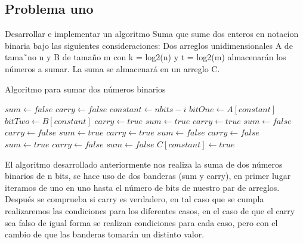 \documentclass[12pt,twoside]{article}
\begin{document}
\subsection*{Problema uno}
Desarrollar e implementar un algoritmo Suma que sume dos enteros en notacion
binaria bajo las siguientes consideraciones: Dos arreglos unidimensionales A de tama˜no n y
B de tamaño m con k = log2(n) y t = log2(m) almacenarán los números a sumar. La suma
se almacenará en un arreglo C.
\\
\begin{algorithm}[H]
    \caption{Algoritmo para sumar dos números binarios}
      \label{euclides}
      \begin{algorithmic}[1]
              \State $sum\gets false$
              \State $carry\gets false$
                      \State $constant\gets nbits-i$
                      \State $bitOne\gets A [constant]$
                      \State $bitTwo\gets B [constant]$
                      \State $carry\gets true$
                      \State $sum\gets true$
                      \State $carry\gets true$
                      \State $sum\gets false$
                      \Else
                      \State $carry\gets false$
                      \State $sum\gets true$
                      \EndIf
                      \Else
                      \State $carry\gets true$
                      \State $sum\gets false$
                      \State $carry\gets false$
                      \State $sum\gets true$
                      \Else
                      \State $carry\gets false$
                      \State $sum\gets false$
                      \EndIf
                      \EndIf
                      \State $C[constant]\gets true$
                      \EndIf
          \EndFor    
          \EndProcedure
      \end{algorithmic}
  \end{algorithm}
\vspace{10 mm}
El algoritmo desarrollado anteriormente nos realiza la suma de dos números binarios de n bits, se hace uso de dos banderas (sum y carry), en primer lugar iteramos de uno en uno hasta el número de bits de nuestro par de arreglos. Después se comprueba si carry es verdadero, en tal caso que se cumpla realizaremos las condiciones para los diferentes casos, en el caso de que el carry sea falso de igual forma se realizan condiciones para cada caso, pero con el cambio de que las banderas tomarán un distinto valor.
\end{document}
